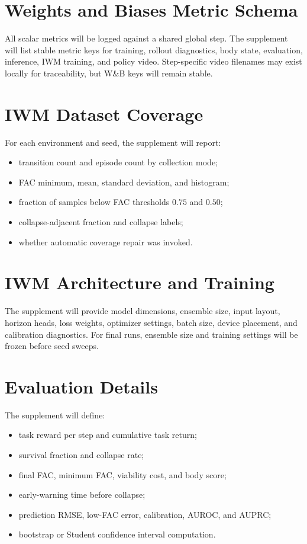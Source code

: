\documentclass{article}
\begin{document}
\section{Weights and Biases Metric Schema}

All scalar metrics will be logged against a shared global step.  The supplement
will list stable metric keys for training, rollout diagnostics, body state,
evaluation, inference, IWM training, and policy video.  Step-specific video
filenames may exist locally for traceability, but W\&B keys will remain stable.

\section{IWM Dataset Coverage}

For each environment and seed, the supplement will report:
\begin{itemize}
    \item transition count and episode count by collection mode;
    \item FAC minimum, mean, standard deviation, and histogram;
    \item fraction of samples below FAC thresholds $0.75$ and $0.50$;
    \item collapse-adjacent fraction and collapse labels;
    \item whether automatic coverage repair was invoked.
\end{itemize}

\section{IWM Architecture and Training}

The supplement will provide model dimensions, ensemble size, input layout,
horizon heads, loss weights, optimizer settings, batch size, device placement,
and calibration diagnostics.  For final runs, ensemble size and training
settings will be frozen before seed sweeps.

\section{Evaluation Details}

The supplement will define:
\begin{itemize}
    \item task reward per step and cumulative task return;
    \item survival fraction and collapse rate;
    \item final FAC, minimum FAC, viability cost, and body score;
    \item early-warning time before collapse;
    \item prediction RMSE, low-FAC error, calibration, AUROC, and AUPRC;
    \item bootstrap or Student confidence interval computation.
\end{itemize}
\end{document}
